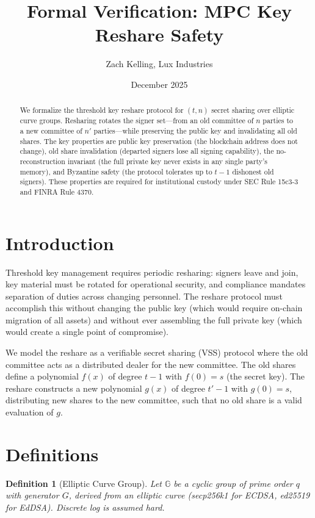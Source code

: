 \documentclass[11pt]{article}
\title{Formal Verification: MPC Key Reshare Safety}
\author{Zach Kelling, Lux Industries}
\date{December 2025}
\newtheorem{definition}[theorem]{Definition}
\begin{document}
\maketitle

\begin{abstract}
We formalize the threshold key reshare protocol for $(t, n)$ secret sharing over elliptic curve groups. Resharing rotates the signer set---from an old committee of $n$ parties to a new committee of $n'$ parties---while preserving the public key and invalidating all old shares. The key properties are public key preservation (the blockchain address does not change), old share invalidation (departed signers lose all signing capability), the no-reconstruction invariant (the full private key never exists in any single party's memory), and Byzantine safety (the protocol tolerates up to $t-1$ dishonest old signers). These properties are required for institutional custody under SEC Rule 15c3-3 and FINRA Rule 4370.
\end{abstract}

\section{Introduction}
Threshold key management requires periodic resharing: signers leave and join, key material must be rotated for operational security, and compliance mandates separation of duties across changing personnel. The reshare protocol must accomplish this without changing the public key (which would require on-chain migration of all assets) and without ever assembling the full private key (which would create a single point of compromise).

We model the reshare as a verifiable secret sharing (VSS) protocol where the old committee acts as a distributed dealer for the new committee. The old shares define a polynomial $f(x)$ of degree $t-1$ with $f(0) = s$ (the secret key). The reshare constructs a new polynomial $g(x)$ of degree $t'-1$ with $g(0) = s$, distributing new shares to the new committee, such that no old share is a valid evaluation of $g$.

\section{Definitions}

\begin{definition}[Elliptic Curve Group]
Let $\mathbb{G}$ be a cyclic group of prime order $q$ with generator $G$, derived from an elliptic curve (secp256k1 for ECDSA, ed25519 for EdDSA). Discrete log is assumed hard.
\end{definition}
\end{document}
